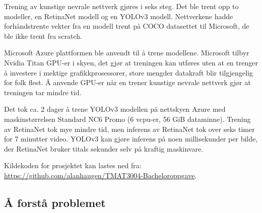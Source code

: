 


Trening av kunstige nevrale nettverk gjøres i seks steg. Det ble trent opp to modeller, en RetinaNet modell og en YOLOv3 modell. Nettverkene hadde forhåndstrente vekter fra en modell trent på COCO datasettet til Microsoft, de ble ikke trent fra scratch. %

Microsoft Azure plattformen ble anvendt til å trene modellene. Microsoft tilbyr Nvidia Titan GPU-er i skyen, det gjør at treningen kan utføres uten at en trenger å investere i mektige grafikkprosessorer, store mengder datakraft blir tilgjengelig for folk flest. Å anvende GPU-er når en trener kunstige nevrale nettverk gjør at treningen tar mindre tid.

Det tok ca. 2 dager å trene YOLOv3 modellen på nettskyen Azure med maskinstørrelsen Standard NC6 Promo (6 vcpu-er, 56 GiB dataminne). Trening av RetinaNet tok mye mindre tid, men inferens av RetinaNet tok over seks timer for 7 minutter video. YOLOv3 kan gjøre inferens på noen millisekunder per bilde, der RetinaNet bruker titals sekunder selv på kraftig maskinvare.%

Kildekoden for prosjektet kan lastes ned fra: \\ \url{https://github.com/alanhaugen/TMAT3004-Bacheloroppgave}.

\subsection{Å forstå problemet}

